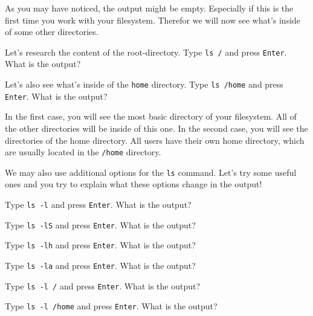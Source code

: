 \begin{challenge}
    \begin{task}
        As you may have noticed, the output might be empty.
        Especially if this is the first time you work with your filesystem.
        Therefor we will now see what's inside of some other directories. 
        \begin{questions}
            \item Let's research the content of the root-directory. Type \texttt{ls /} and press \texttt{Enter}. What is the output?
            \item Let's also see what's inside of the \texttt{home} directory. Type \texttt{ls /home} and press \texttt{Enter}. What is the output?
        \end{questions}
        In the first case, you will see the most basic directory of your filesystem.
        All of the other directories will be inside of this one.
        In the second case, you will see the directories of the home directory.
        All users have their own home directory, which are usually located in the \texttt{/home} directory.
    \end{task}

    \begin{task}
        We may also use additional options for the \texttt{ls} command.
        Let's try some useful ones and you try to explain what these options change in the output!
        \begin{questions}
            \item Type \texttt{ls -l} and press \texttt{Enter}. What is the output?
            \item Type \texttt{ls -lS} and press \texttt{Enter}. What is the output?
            \item Type \texttt{ls -lh} and press \texttt{Enter}. What is the output?
            \item Type \texttt{ls -la} and press \texttt{Enter}. What is the output?
            \item Type \texttt{ls -l /} and press \texttt{Enter}. What is the output?
            \item Type \texttt{ls -l /home} and press \texttt{Enter}. What is the output?
        \end{questions}
    \end{task}


\end{challenge}
